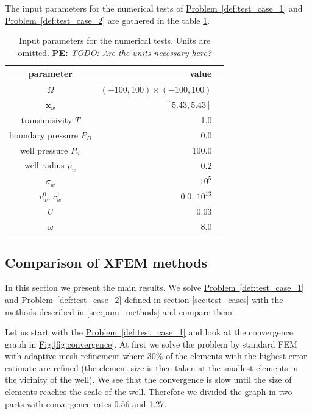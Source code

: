 \documentclass[preprint,12pt]{elsarticle}
\newcommand{\probref}[1]{\hyperref[#1]{Problem~\ref{#1}}}
\newcommand{\fig}[1]{\hyperref[#1]{Fig.\ref{#1}}}
\def\vc#1{\mathbf{\boldsymbol{#1}}}     %
\newcommand{\notePE}[1]{{\color{Orange} \textbf{PE: } \textit{#1}}}
\begin{document}
The input parameters for the numerical tests of \probref{def:test_case_1} and \probref{def:test_case_2} 
are gathered in the table \ref{tab:parameters}.
%
\begin{table}[!ht]
\begin{center}
\begin{tabular}{crr}
\toprule
parameter    & value \\
\midrule
$\Omega$   & $(-100,100)\times(-100,100)$   \\
$\vc{x}_w$  & $[5.43,5.43]$   \\
transimisivity $T$          & 1.0   \\
boundary pressure $P_D$     & 0.0   \\
well pressure $P_w$         & 100.0 \\
well radius $\rho_w$        & 0.2 \\
$\sigma_w$                  & $10^5$ \\
$c_w^0$, $c_w^1$            & 0.0, $10^{13}$ \\
$U$                         & 0.03 \\
$\omega$                    & 8.0 \\
\bottomrule
\end{tabular}
\caption{Input parameters for the numerical tests. Units are omitted.
\notePE{TODO: Are the units necessary here?}}
\label{tab:parameters}
\end{center}
\end{table}
%






\subsection{Comparison of XFEM methods}
In this section we present the main results. We solve \probref{def:test_case_1} and \probref{def:test_case_2} 
defined in section \ref{sec:test_cases} with the methods described in \ref{sec:pum_methods} and compare them.

Let us start with the \probref{def:test_case_1} and look at the convergence graph in \fig{fig:convergence}.
At first we solve the problem by standard FEM with adaptive mesh refinement where 30\% of the elements
with the highest error estimate are refined (the element size is then taken at the smallest elements in the 
vicinity of the well). We see that the convergence is slow until the size of elements reaches the scale of the
well. Therefore we divided the graph in two parts with convergence rates 0.56 and 1.27.
\end{document}
